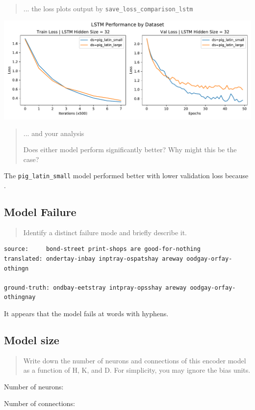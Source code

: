 \documentclass{article}
\begin{document}
\begin{quote}
... the loss plots output by \texttt{save\_loss\_comparison\_lstm}
\end{quote}

\includegraphics[width=\linewidth]{loss_plot_lstm}

\begin{quote}
... and your analysis

Does  either  model perform significantly better?  Why might this be the case?
\end{quote}

The \texttt{pig\_latin\_small} model performed better with lower validation loss because \todo{}.



\subsection*{Model Failure}

\begin{quote}
Identify a distinct failure mode and briefly describe it.
\end{quote}

\begin{lstlisting}
source:		bond-street print-shops are good-for-nothing 
translated:	ondertay-inbay inptray-ospatshay areway oodgay-orfay-othingn

ground-truth: ondbay-eetstray intpray-opsshay areway oodgay-orfay-othingnay
\end{lstlisting}

It appears that the model fails at words with hyphens. %


\subsection*{Model size}


\begin{quote}
Write down the number of neurons and connections of this encoder model as a function of H, K, and D.  For simplicity, you may ignore the bias units.
\end{quote}

Number of neurons: \todo{}

Number of connections: \todo{}
\end{document}
